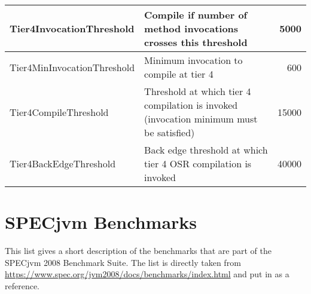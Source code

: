 \begin{table}[h]
\begin{center}
\begin{tabular}{| l | p{9.0cm} | r | }
       Tier4InvocationThreshold & Compile if number of method invocations crosses this threshold & 5000 \\ \hline
       Tier4MinInvocationThreshold & Minimum invocation to compile at tier 4 & 600 \\ \hline
       Tier4CompileThreshold & Threshold at which tier 4 compilation is invoked (invocation minimum must be satisfied) & 15000 \\ \hline
       Tier4BackEdgeThreshold & Back edge threshold at which tier 4 OSR compilation is invoked & 40000 \\ \hline
    \end{tabular}
  \end{center}
\end{table}

\section{SPECjvm Benchmarks}
\label{a:specjvm_benchmarks}
This list gives a short description of the benchmarks that are part of the SPECjvm 2008 Benchmark Suite.
The list is directly taken from \url{https://www.spec.org/jvm2008/docs/benchmarks/index.html} and put in as a reference.
